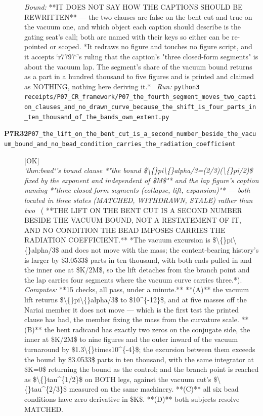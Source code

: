 \begin{description}
 \emph{Bound:}  **IT DOES NOT SAY HOW THE CAPTIONS SHOULD BE REWRITTEN** --- the two clauses are false on the bent cut and true on the vacuum one, and which object each caption should describe is the gating seat's call; both are named with their keys so either can be re-pointed or scoped. *It redraws no figure and touches no figure script, and it accepts `r7797`'s ruling that the caption's "three closed-form segments" is about the vacuum lap. The segment's share of the vacuum bound returns as a part in a hundred thousand to five figures and is printed and claimed as NOTHING, nothing here deriving it.*
\ \emph{Run:} \texttt{python3 receipts/P07\_CR\_framework/P07\_the\_fourth\_segment\_moves\_two\_caption\_clauses\_and\_no\_drawn\_curve\_because\_the\_shift\_is\_four\_parts\_in\_ten\_thousand\_of\_the\_bands\_own\_extent.py}
\item[\rcptlabel{P07_the_lift_on_the_bent_cut_is_a_second_number_beside_the_vacuum_bound_and_no_bead_condition_carries_the_radiation_coefficient}{P7R32}\textbf{P7R32}\quad\texttt{P07\_the\_lift\_on\_the\_bent\_cut\_is\_a\_second\_number\_beside\_the\_vacuum\_bound\_and\_no\_bead\_condition\_carries\_the\_radiation\_coefficient}]\hfill\textsf{[OK]}\\
\textit{`thm:bead`'s bound clause *"the bound \$\textbackslash\{\}pi\textbackslash\{\}alpha/3=(2/3)(\textbackslash\{\}pi/2)\$ fixed by the exponent and independent of \$M\$"* and the lap figure's caption naming *"three closed-form segments (collapse, lift, expansion)"* --- both located in three states (MATCHED, WITHDRAWN, STALE) rather than two} \ ( **THE LIFT ON THE BENT CUT IS A SECOND NUMBER BESIDE THE VACUUM BOUND, NOT A RESTATEMENT OF IT, AND NO CONDITION THE BEAD IMPOSES CARRIES THE RADIATION COEFFICIENT.** *The vacuum excursion is \$\textbackslash\{\}pi\textbackslash\{\}alpha/3\$ and does not move with the mass; the content-bearing history's is larger by \$3.0533\$ parts in ten thousand, with both ends pulled in and the inner one at \$K/2M\$, so the lift detaches from the branch point and the lap carries four segments where the vacuum curve carries three.*). 
\emph{Computes:} **15 checks, all pass, under a minute.** **(A)** the vacuum lift returns \$\textbackslash\{\}pi\textbackslash\{\}alpha/3\$ to \$10\textasciicircum{}\{-12\}\$, and at five masses off the Nariai member it does not move --- which is the first test the printed clause has had, the member fixing the mass from the curvature scale. **(B)** the bent radicand has exactly two zeros on the conjugate side, the inner at \$K/2M\$ to nine figures and the outer inward of the vacuum turnaround by \$1.3\textbackslash\{\}times10\textasciicircum{}\{-4\}\$; the excursion between them exceeds the bound by \$3.0533\$ parts in ten thousand, with the same integrator at \$K=0\$ returning the bound as the control; and the branch point is reached as \$\textbackslash\{\}tau\textasciicircum{}\{1/2\}\$ on BOTH legs, against the vacuum cut's \$\textbackslash\{\}tau\textasciicircum{}\{2/3\}\$ measured on the same machinery. **(C)** all six bead conditions have zero derivative in \$K\$. **(D)** both subjects resolve MATCHED.

\end{description}
